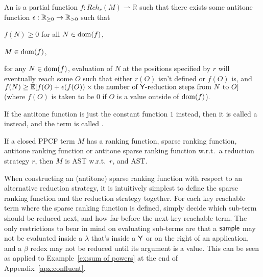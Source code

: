 \begin{definition}\rm
An  is a partial function $f : \mathit{Rch}_r(M) \rightharpoonup \mathbb R$ such that there exists some antitone function $\epsilon : \mathbb{R}_{{\geq}0} \to \mathbb{R}_{{>}0}$ such that
\begin{inparaenum}[(i)]
    \item $f(N) \geq 0$ for all $N \in \operatorname{dom}(f)$,
    \item $M \in \operatorname{dom}(f)$,
    \item for any $N \in \operatorname{dom}(f)$, evaluation of $N$ at the positions specified by $r$ will eventually reach some $O$ such that either $r(O)$ isn't defined or $f(O)$ is, and $f(N) \geq \mathbb E[f(O) + \epsilon(f(O)) \times \text{the number of $\tY$-reduction steps from $N$ to $O$}]$ (where $f(O)$ is taken to be 0 if $O$ is a value outside of $\operatorname{dom}(f)$).
\end{inparaenum}
\iffalse
\begin{itemize}
    \item $f(N) \geq 0$ for all $N$ where $f$ is defined.
    \item $f$ is defined at $M$.
    \item For any $N$ in the domain of definition of $f$, evaluation of $N$ at the positions specified by $r$ will eventually reach some $O$ such that either $r(O)$ isn't defined or $f(O)$ is, and $f(N) \geq \mathbb E[f(O) + \epsilon(f(O)) \times \text{the number of $\tY$-reduction steps from $N$ to $O$}]$ (where $f(O)$ is taken to be 0 if $O$ is a value outside of the domain of $f$).
\end{itemize}
\fi
\end{definition}

If the antitone function is just the constant function $1$ instead, then it is called a  instead, and the term is called .

\begin{therm} \label{thm:confluent ranking}
If a closed PPCF term $M$ has a ranking function, sparse ranking function, antitone ranking function or antitone sparse ranking function w.r.t.~a reduction strategy $r$, then $M$ is AST w.r.t.~$r$, and AST.
\end{therm}

When constructing an (antitone) sparse ranking function with respect to an alternative reduction strategy, it is intuitively simplest to define the sparse ranking function and the reduction strategy together. For each key reachable term where the sparse ranking function is defined, simply decide which sub-term should be reduced next, and how far before the next key reachable term. The only restrictions to bear in mind on evaluating sub-terms are that a $\mathsf{sample}$ may not be evaluated inside a $\lambda$ that's inside a $\mathsf{Y}$ or on the right of an application, and a $\beta$ redex may not be reduced until its argument is a value. This can be seen as applied to Example~\ref{ex:sum of powers} at the end of Appendix~\ref{apx:confluent}.

